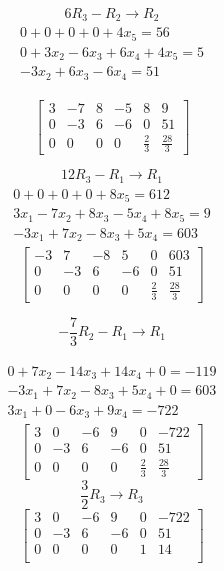 \documentclass[12pt letter]{report}
\begin{document}
{  \[
    6R_3 - R_2 \to R_2
  \]
  \begin{align*}
    \begin{split}
      0 + 0 + 0 + 0 + 4x_5 = 56         \\
      0 + 3x_2 - 6x_3 + 6x_4 + 4x_5 = 5 \\
      \hline
      -3x_2 + 6x_3 -6x_4 = 51
    \end{split}
  \end{align*}

  \[
    \begin{bmatrix}
      3 & -7 & 8 & -5 & 8           & 9            \\
      0 & -3 & 6 & -6 & 0           & 51           \\
      0 & 0  & 0 & 0  & \frac{2}{3} & \frac{28}{3}
    \end{bmatrix}
  \]

  \[
    12R_3 - R_1 \to R_1
  \]
  \begin{align*}
    \begin{split}
      0 + 0 + 0 + 0 + 8x_5 = 612          \\
      3x_1 -7x_2 + 8x_3 - 5x_4 + 8x_5 = 9 \\
      \hline
      -3x_1 + 7x_2 - 8x_3 + 5x_4  = 603
    \end{split}
  \end{align*}
  \[
    \begin{bmatrix}
      -3 & 7  & -8 & 5  & 0           & 603          \\
      0  & -3 & 6  & -6 & 0           & 51           \\
      0  & 0  & 0  & 0  & \frac{2}{3} & \frac{28}{3}
    \end{bmatrix}
  \]

  \[
    -\frac{7}{3}R_2 - R_1 \to R_1
  \]

  \begin{align*}
    \begin{split}
      0 + 7x_2 -14x_3  + 14x_4 + 0 = -119  \\
      -3x_1 + 7x_2 - 8x_3 + 5x_4 + 0 = 603 \\
      \hline
      3x_1 + 0 -6x_3 + 9x_4 = -722
    \end{split}
  \end{align*}
  \[
    \begin{bmatrix}
      3 & 0  & -6 & 9  & 0           & -722         \\
      0 & -3 & 6  & -6 & 0           & 51           \\
      0 & 0  & 0  & 0  & \frac{2}{3} & \frac{28}{3}
    \end{bmatrix}
  \]
  \[
    \frac{3}{2}R_3 \to R_3
  \]
  \[
    \begin{bmatrix}
      3 & 0  & -6 & 9  & 0 & -722 \\
      0 & -3 & 6  & -6 & 0 & 51   \\
      0 & 0  & 0  & 0  & 1 & 14   \\
    \end{bmatrix}
  \]

}
\end{document}
